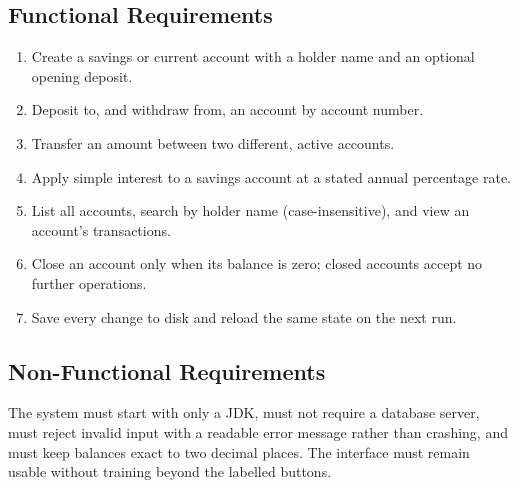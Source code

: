 \documentclass[11pt,a4paper]{report}
\begin{document}
\subsection{Functional Requirements}
\begin{enumerate}
    \item Create a savings or current account with a holder name and an optional opening deposit.
    \item Deposit to, and withdraw from, an account by account number.
    \item Transfer an amount between two different, active accounts.
    \item Apply simple interest to a savings account at a stated annual percentage rate.
    \item List all accounts, search by holder name (case-insensitive), and view an account's transactions.
    \item Close an account only when its balance is zero; closed accounts accept no further operations.
    \item Save every change to disk and reload the same state on the next run.
\end{enumerate}

\subsection{Non-Functional Requirements}
The system must start with only a JDK, must not require a database server, must reject invalid input with a readable error message rather than crashing, and must keep balances exact to two decimal places. The interface must remain usable without training beyond the labelled buttons.
\end{document}
